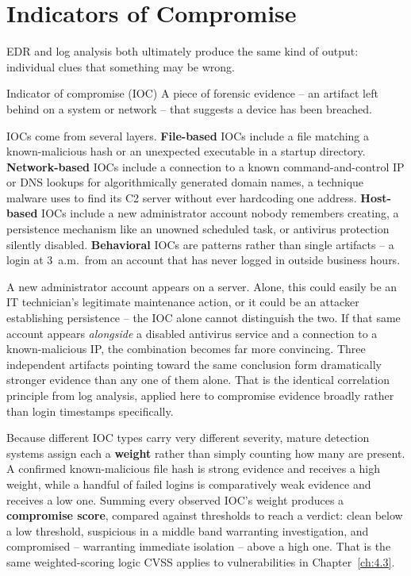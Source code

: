 \section{Indicators of Compromise}

EDR and log analysis both ultimately produce the same kind of output: individual clues that
something may be wrong.

\begin{definition}{Indicator of compromise (IOC)}
A piece of forensic evidence -- an artifact left behind on a system or network -- that suggests a
device has been breached.
\end{definition}

IOCs come from several layers. \textbf{File-based} IOCs include a file matching a known-malicious
hash or an unexpected executable in a startup directory. \textbf{Network-based} IOCs include a
connection to a known command-and-control IP or DNS lookups for algorithmically generated domain
names, a technique malware uses to find its C2 server without ever hardcoding one address.
\textbf{Host-based} IOCs include a new administrator account nobody remembers creating, a
persistence mechanism like an unowned scheduled task, or antivirus protection silently disabled.
\textbf{Behavioral} IOCs are patterns rather than single artifacts -- a login at 3~a.m.\ from an
account that has never logged in outside business hours.

\begin{example}
A new administrator account appears on a server. Alone, this could easily be an IT technician's
legitimate maintenance action, or it could be an attacker establishing persistence -- the IOC alone
cannot distinguish the two. If that same account appears \emph{alongside} a disabled antivirus
service and a connection to a known-malicious IP, the combination becomes far more convincing. Three
independent artifacts pointing toward the same conclusion form dramatically stronger evidence than
any one of them alone. That is the identical correlation principle from log analysis, applied here
to compromise evidence broadly rather than login timestamps specifically.
\end{example}

Because different IOC types carry very different severity, mature detection systems assign each a
\textbf{weight} rather than simply counting how many are present. A confirmed known-malicious file
hash is strong evidence and receives a high weight, while a handful of failed logins is comparatively
weak evidence and receives a low one. Summing every observed IOC's weight produces a
\textbf{compromise score}, compared against thresholds to reach a verdict: clean below a low
threshold, suspicious in a middle band warranting investigation, and compromised -- warranting
immediate isolation -- above a high one. That is the same weighted-scoring logic CVSS applies to
vulnerabilities in Chapter~\ref{ch:4.3}.

